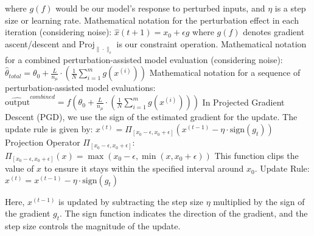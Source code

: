 where $g(f)$ would be our model’s response to perturbed inputs, and $\eta$ is a step size or learning rate.
Mathematical notation for the perturbation effect in each iteration (considering noise):
$\hat{x}(t+1) = x_0 + \epsilon g$
where $g(f)$ denotes gradient ascent/descent and $\text{Proj}_{\|\cdot\|_{\epsilon}}$ is our constraint operation.
Mathematical notation for a combined perturbation-assisted model evaluation (considering noise):
$\hat{\theta}_{total} = \theta_0 + \frac{L}{n_\mu} \cdot \left( \frac{1}{N} \sum_{i=1}^{m} g(x^{(i)}) \right)$
Mathematical notation for a sequence of perturbation-assisted model evaluations:
$\hat{\text{output}}^{combined} = f \left( \theta_0 + \frac{L}{n_\mu} \cdot \left( \frac{1}{N} \sum_{i=1}^{m} g(x^{(i)}) \right) \right)$
In Projected Gradient Descent (PGD), we use the sign of the estimated gradient for the update. The update rule is given by:
$x^{(t)} = \Pi_{[x_0 - \epsilon, x_0 + \epsilon]} \left( x^{(t-1)} - \eta \cdot \text{sign}(g_t) \right)$
Projection Operator $ \Pi_{[x_0 - \epsilon, x_0 + \epsilon]} $:
$\Pi_{[x_0 - \epsilon, x_0 + \epsilon]}(x) = \max \left( x_0 - \epsilon, \min \left( x, x_0 + \epsilon \right) \right)$
This function clips the value of $ x $ to ensure it stays within the specified interval around $ x_0 $.
Update Rule:
$x^{(t)} = x^{(t-1)} - \eta \cdot \text{sign}(g_t)$

Here, $ x^{(t-1)} $ is updated by subtracting the step size $ \eta $ multiplied by the sign of the gradient $ g_t $. The sign function indicates the direction of the gradient, and the step size controls the magnitude of the update.
